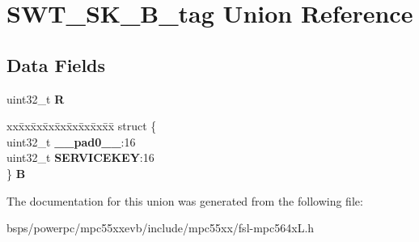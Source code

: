 \hypertarget{unionSWT__SK__32B__tag}{}\section{S\+W\+T\+\_\+\+S\+K\+\_\+B\+\_\+tag Union Reference}
\label{unionSWT__SK__32B__tag}
\subsection*{Data Fields}
\begin{DoxyCompactItemize}
\item 
\mbox{\label{unionSWT__SK__32B__tag_a1810b8be4fc2355e3223cbbf4da44992}} 
uint32\+\_\+t {\bfseries R}
\item 
\mbox{\label{unionSWT__SK__32B__tag_ab7e7473f4fdcf03d926e3f6f9ce70c20}} 
\begin{tabbing}
xx\=xx\=xx\=xx\=xx\=xx\=xx\=xx\=xx\=\kill
struct \{\\
\>uint32\_t {\bfseries \_\_pad0\_\_}:16\\
\>uint32\_t {\bfseries SERVICEKEY}:16\\
\} {\bfseries B}\\

\end{tabbing}\end{DoxyCompactItemize}


The documentation for this union was generated from the following file\+:\begin{DoxyCompactItemize}
\item 
bsps/powerpc/mpc55xxevb/include/mpc55xx/fsl-\/mpc564x\+L.\+h\end{DoxyCompactItemize}
